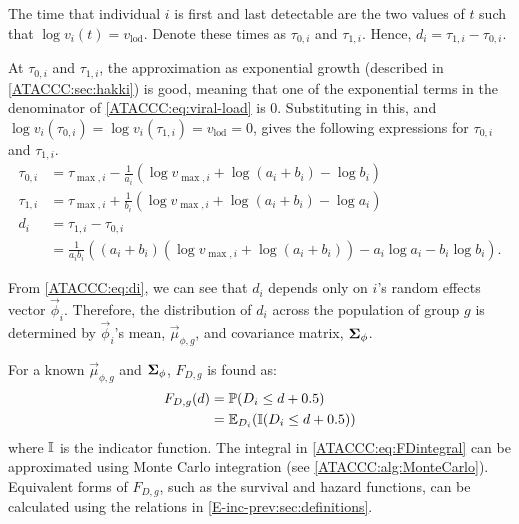 \documentclass[thesis.tex]{subfiles}
\begin{document}
The time that individual $i$ is first and last detectable are the two values of $t$ such that $\log v_i(t) = v_\text{lod}$.
Denote these times as $\tau_{0,i}$ and $\tau_{1,i}$.
Hence, $d_i = \tau_{1,i} - \tau_{0,i}$.

At $\tau_{0,i}$ and $\tau_{1,i}$, the approximation as exponential growth (described in \cref{ATACCC:sec:hakki}) is good, meaning that one of the exponential terms in the denominator of \cref{ATACCC:eq:viral-load} is 0.
Substituting in this, and $\log v_i(\tau_{0,i}) = \log v_i(\tau_{1,i}) = v_\text{lod} = 0$, gives the following expressions for $\tau_{0,i}$ and $\tau_{1,i}$.
\begin{align}
\tau_{0,i}
&= \tau_{\max,i} - \frac{1}{a_i} \left(\log v_{\max,i} + \log(a_i + b_i) - \log b_i \right) \\
\tau_{1,i}
&= \tau_{\max,i} + \frac{1}{b_i} \left(\log v_{\max,i} + \log(a_i + b_i) - \log a_i \right) \\
d_i
&= \tau_{1,i} - \tau_{0,i}  \\
&= \frac{1}{a_i b_i} \left( (a_i + b_i) (\log v_{\max,i} + \log(a_i + b_i)) - a_i \log a_i - b_i \log b_i \right).
\label{ATACCC:eq:di}
\end{align}

From \cref{ATACCC:eq:di}, we can see that $d_i$ depends only on $i$'s random effects vector $\vec{\phi}_i$.
Therefore, the distribution of $d_i$ across the population of group $g$ is determined by $\vec{\phi}_i$'s mean, $\vec{\mu}_{\phi,g}$, and covariance matrix, $\bm{\Sigma}_\phi$.

For a known $\vec{\mu}_{\phi,g}$ and $\bm{\Sigma}_\phi$, $F_{D,g}$ is found as:
\begin{align}
  F_{D,g}(d)
  &= \operatorname{\mathbb{P}}(D_i \leq d + 0.5) \\
  &= \operatorname{\mathbb{E}}_{D_i}(\operatorname{\mathbb{I}}(D_i \leq d + 0.5))
  \label{ATACCC:eq:FDintegral}
\end{align}
where $\operatorname{\mathbb{I}}$ is the indicator function.
The integral in \cref{ATACCC:eq:FDintegral} can be approximated using Monte Carlo integration (see \cref{ATACCC:alg:MonteCarlo}).
Equivalent forms of $F_{D,g}$, such as the survival and hazard functions, can be calculated using the relations in \cref{E-inc-prev:sec:definitions}.
\end{document}
